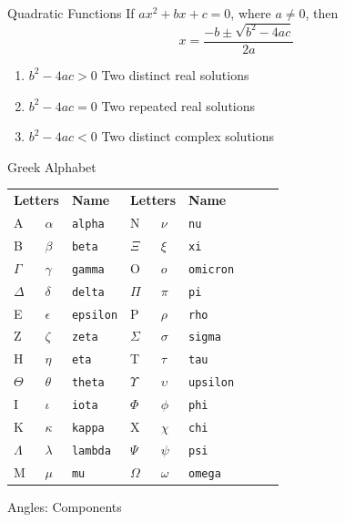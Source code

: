 \documentclass[10pt,landscape]{article}
\begin{document}
\begin{multicols}{3}
\begin{mysection}{Quadratic Functions}
 If $ax^2+bx+c=0$, where $a \ne 0$, then \\

 \[
 x= \dfrac{-b\pm \sqrt{b^2-4ac}}{2a}
 \]

 \begin{enumerate}
 	\item $b^2-4ac>0$ Two distinct real solutions
 	\item $b^2-4ac=0$ Two repeated real solutions
 	\item $b^2-4ac<0$ Two distinct complex solutions
 \end{enumerate}
 \end{mysection}


\begin{mysection}{Greek Alphabet}

\begin{tabular}{lllllllll}
\multicolumn{2}{l}{\textbf{Letters}} & \textbf{Name} & \multicolumn{2}{l}{\textbf{Letters}} &\textbf{Name} \\[4pt]
A & $\alpha$ & \texttt{alpha}			& N & $\nu$ & \texttt{nu} \\
B & $\beta$ & \texttt{beta} 			& $\Xi$ & $\xi$ & \texttt{xi} \\
$\Gamma$ & $\gamma$ & \texttt{gamma} 	& O & $o$ & \texttt{omicron} \\
$\Delta$ & $\delta$ & \texttt{delta} 	& $\Pi$ & $\pi$ & \texttt{pi}\\
E & $\epsilon$ & \texttt{epsilon} 		& P & $\rho$ & \texttt{rho}\\
Z & $\zeta$ & \texttt{zeta} 			& $\Sigma$ & $\sigma$ & \texttt{sigma}\\
H & $\eta$ & \texttt{eta} 				& T & $\tau$ & \texttt{tau}\\
$\Theta$ & $\theta$ & \texttt{theta} 	& $\Upsilon$ & $\upsilon$ & \texttt{upsilon}\\
I & $\iota$ & \texttt{iota} 			& $\Phi$ & $\phi$ & \texttt{phi}\\
K & $\kappa$ & \texttt{kappa} 			& X & $\chi$ & \texttt{chi}\\
$\Lambda$ & $\lambda$ & \texttt{lambda}	& $\Psi$ & $\psi$ & \texttt{psi}\\
M & $\mu$ & \texttt{mu} 				& $\Omega$ & $\omega$ & \texttt{omega}
\end{tabular}
\end{mysection}

\begin{mysection}{Angles: Components}


\end{mysection}
\end{multicols}
\end{document}
